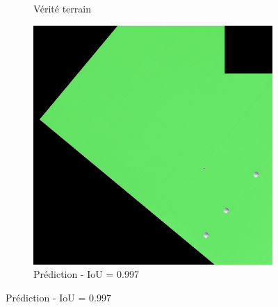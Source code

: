 \begin{figure}[H]
\begin{subfigure}{0.32\textwidth}
    \caption{Vérité terrain}
\end{subfigure}
\hfill
\begin{subfigure}{0.32\textwidth}
    \includegraphics[width=\textwidth]{02-main//figures/ch4/kfold_ensembles/linknet_timm-efficientnet-b5/best_cases/best_5_iou0.997_24991116_tile_5_3_322356_overlay_pred.png}
    \caption{Prédiction - IoU = 0.997}
\end{subfigure}

\vspace{0.35cm}


\end{figure}
